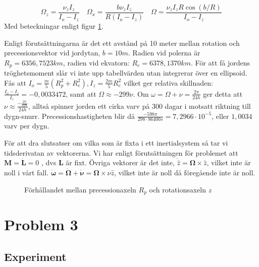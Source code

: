 \documentclass[12pt,a4paper]{article}
\begin{document}
	\begin{equation*}
		\Omega_z = \frac{\nu_z I_z}{I_o-I_z}
		\hspace{12pt}
		\Omega_x = \frac{b \nu_z I_z}{R(I_o-I_z)}
		\hspace{12pt}
		\Omega = \frac{\nu_z I_z R \cos(b/R)}{I_o-I_z}
	\end{equation*}
	Med beteckningar enligt figur \ref{jorden}.

	Enligt förutsättningarna är det ett avstånd på 10 meter mellan rotation och
	precessionsvektor vid jordytan, $b=10m$. Radien vid polerna är $R_p= 6356,7523 km$,
	radien vid ekvatorn: $R_e=6378,1370 km$. För att få jordens tröghetsmoment slår vi
	inte upp tabellvärden utan integrerar över en ellipsoid.
	Fås att $I_o = \frac{m}{5}(R_p^2+R_e^2), I_z = \frac{2m}{5}R_e^2$ vilket ger relativa
	skillnaden: $\frac{I_o-I_z}{I_z} = -0,0033472$, samt att $\Omega \approx -299\nu$. Om
	$\omega=\Omega+\nu = \frac{2\pi}{24h}$ ger detta att
	$\nu \approx \frac{-\frac{2\pi}{298}}{24h}$, alltså spinner jorden ett cirka varv på 300
	dagar i motsatt riktning till dygn-snurr. Precessionshastigheten blir då $\frac{-598\pi}{298 \cdot 86400 s} =7,2966 \cdot 10^{-5}$, eller $1,0034$ varv per dygn.

	
	För att dra slutsatser om vilka som är fixta i ett inertialsystem så tar vi tidsderivatan av
	vektorerna. Vi har enligt förutsättningen för problemet att $\mathbf{M} = \dot{\mathbf{L}}=0$ ,
	dvs $\mathbf{L}$ är fixt. Övriga vektorer är det inte, $\dot{\hat{z}}=\boldsymbol{\Omega} \times \hat{z}$,
	vilket inte är noll i vårt fall. $\dot{\boldsymbol{\omega}} = \dot{\boldsymbol{\Omega}}+\dot{\boldsymbol{\nu}} =
	\boldsymbol{\Omega} \times \nu \hat{z}$, vilket inte är noll då föregående inte är noll.
	
	\begin{figure}
		\begin{center}
			
			\caption{Förhållandet mellan precessionaxeln $R_p$ och rotationsaxeln $z$}
                        \label{jorden}
		\end{center}
	\end{figure}
	
\section{Problem 3}
	
	
	\subsection{Experiment}
		
\end{document}
